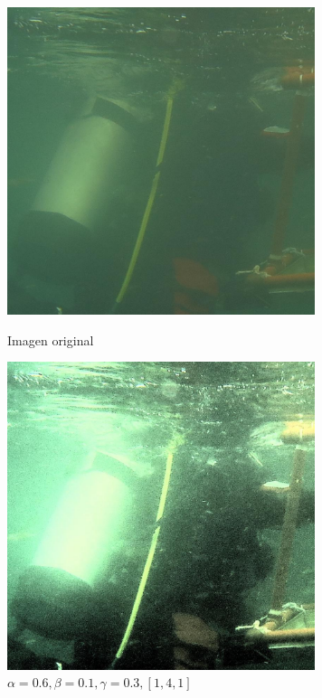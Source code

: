 \begin{figure}[H]
\begin{minipage}[c]{0.48\linewidth}
  \includegraphics[height=9cm]{imgs/1908xx.pdf}
  \caption{Imagen original}
\end{minipage}
\hfill
\begin{minipage}[c]{0.48\linewidth}
  \includegraphics[height=9cm]{imgs/1908xxOut.pdf}
    \caption{$\alpha = 0.6, \beta = 0.1, \gamma = 0.3, [1, 4, 1]$}
\end{minipage}%
\end{figure}

